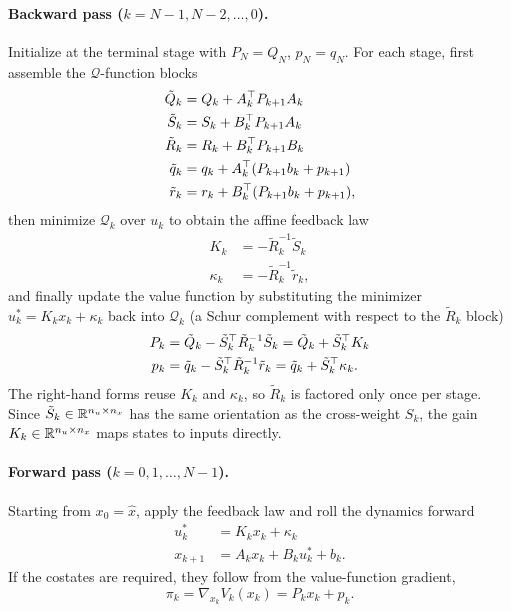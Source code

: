 \paragraph{Backward pass ($k = N-1, N-2, \ldots, 0$).}
Initialize at the terminal stage with $P_N = Q_N$, $p_N = q_N$.
For each stage, first assemble the $\mathcal{Q}$-function blocks
\begin{align*}
\tilde{Q}_k &= Q_k + A_k^\top P_{k+1} A_k \\
\tilde{S}_k &= S_k + B_k^\top P_{k+1} A_k \\
\tilde{R}_k &= R_k + B_k^\top P_{k+1} B_k \\
\tilde{q}_k &= q_k + A_k^\top (P_{k+1} b_k + p_{k+1}) \\
\tilde{r}_k &= r_k + B_k^\top (P_{k+1} b_k + p_{k+1}) ,
\end{align*}
then minimize $\mathcal{Q}_k$ over $u_k$ to obtain the affine feedback law
\begin{align*}
K_k &= -\tilde{R}_k^{-1} \tilde{S}_k \\
\kappa_k &= -\tilde{R}_k^{-1} \tilde{r}_k ,
\end{align*}
and finally update the value function by substituting the minimizer
$u_k^* = K_k x_k + \kappa_k$ back into $\mathcal{Q}_k$ (a Schur complement with
respect to the $\tilde{R}_k$ block)
\begin{align*}
P_k &= \tilde{Q}_k - \tilde{S}_k^\top \tilde{R}_k^{-1} \tilde{S}_k = \tilde{Q}_k + \tilde{S}_k^\top K_k \\
p_k &= \tilde{q}_k - \tilde{S}_k^\top \tilde{R}_k^{-1} \tilde{r}_k = \tilde{q}_k + \tilde{S}_k^\top \kappa_k .
\end{align*}
The right-hand forms reuse $K_k$ and $\kappa_k$, so $\tilde{R}_k$ is factored only
once per stage. Since $\tilde{S}_k \in \mathbb{R}^{n_u \times n_x}$ has the same orientation
as the cross-weight $S_k$, the gain $K_k \in \mathbb{R}^{n_u \times n_x}$ maps states to
inputs directly.

\paragraph{Forward pass ($k = 0, 1, \ldots, N-1$).}
Starting from $x_0 = \hat{x}$, apply the feedback law and roll the dynamics forward
\begin{align*}
u_k^* &= K_k x_k + \kappa_k \\
x_{k+1} &= A_k x_k + B_k u_k^* + b_k .
\end{align*}
If the costates are required, they follow from the value-function gradient,
\[
\pi_k = \nabla_{x_k} V_k(x_k) = P_k x_k + p_k .
\]

